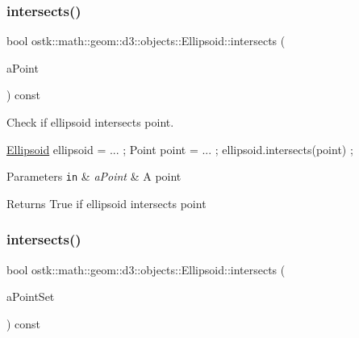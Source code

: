 \subsubsection{\texorpdfstring{intersects()}{intersects()}\hspace{0.1cm}{\footnotesize\ttfamily [1/10]}}
{\footnotesize\ttfamily bool ostk\+::math\+::geom\+::d3\+::objects\+::\+Ellipsoid\+::intersects (\begin{DoxyParamCaption}\item[{const \hyperlink{classostk_1_1math_1_1geom_1_1d3_1_1objects_1_1_point}{Point} \&}]{a\+Point }\end{DoxyParamCaption}) const}



Check if ellipsoid intersects point. 


\begin{DoxyCode}
\hyperlink{classostk_1_1math_1_1geom_1_1d3_1_1objects_1_1_ellipsoid_acd84276f65a14db12623402a411712b7}{Ellipsoid} ellipsoid = ... ;
Point point = ... ;
ellipsoid.intersects(point) ;
\end{DoxyCode}



\begin{DoxyParams}[1]{Parameters}
\mbox{\tt in}  & {\em a\+Point} & A point \\
\hline
\end{DoxyParams}
\begin{DoxyReturn}{Returns}
True if ellipsoid intersects point 
\end{DoxyReturn}
\mbox{\label{classostk_1_1math_1_1geom_1_1d3_1_1objects_1_1_ellipsoid_aba612161728349d5302ce7625674893e}} 
\subsubsection{\texorpdfstring{intersects()}{intersects()}\hspace{0.1cm}{\footnotesize\ttfamily [2/10]}}
{\footnotesize\ttfamily bool ostk\+::math\+::geom\+::d3\+::objects\+::\+Ellipsoid\+::intersects (\begin{DoxyParamCaption}\item[{const \hyperlink{classostk_1_1math_1_1geom_1_1d3_1_1objects_1_1_point_set}{Point\+Set} \&}]{a\+Point\+Set }\end{DoxyParamCaption}) const}



